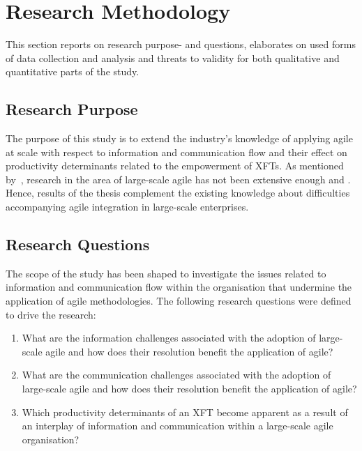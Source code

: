 \chapter{Research Methodology}
\label{chap:research-methodology}

This section reports on research purpose- and questions, elaborates on used forms of data collection and analysis and threats to validity for both qualitative and quantitative parts of the study.  

\section{Research Purpose}

The purpose of this study is to extend the industry's knowledge of applying agile at scale with respect to information and communication flow and their effect on productivity determinants related to the empowerment of \acp{XFT}. As mentioned by~\citet{ding2013research}, research in the area of large-scale agile has not been extensive enough and . Hence, results of the thesis complement the existing knowledge about difficulties accompanying agile integration in large-scale enterprises. 

\section{Research Questions}

The scope of the study has been shaped to investigate the issues related to information and communication flow within the organisation that undermine the application of agile methodologies. The following research questions were defined to drive the research:

\begin{enumerate}
   \item What are the information challenges associated with the adoption of large-scale agile and how does their resolution benefit the application of agile?
   
   \item What are the communication challenges associated with the adoption of large-scale agile and how does their resolution benefit the application of agile?
   
   \item Which productivity determinants of an \ac{XFT} become apparent as a result of an interplay of information and communication within a large-scale agile organisation?
\end{enumerate}

